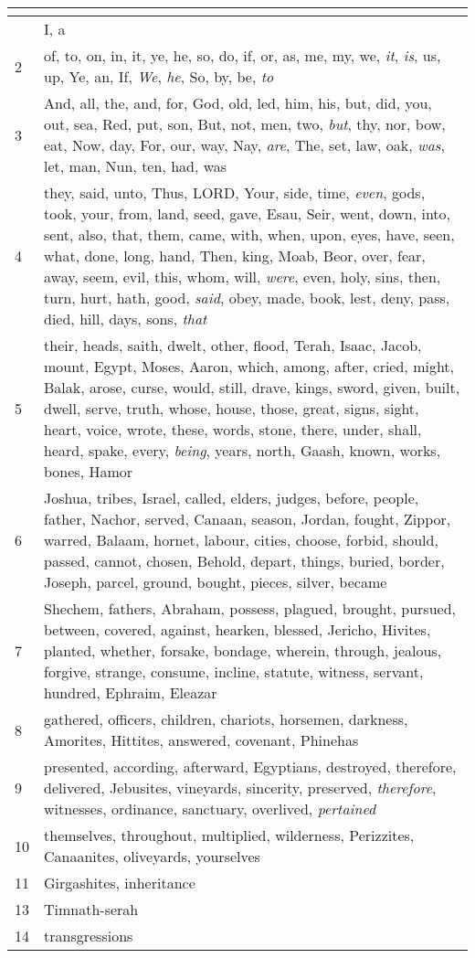 \begin{center}
\begin{longtable}{l|p{3.75in}}
\hline \multicolumn{2}{c}{{ }} \\ \hline
\endfoot 
1 & I, a\\ \hline 
2 & of, to, on, in, it, ye, he, so, do, if, or, as, me, my, we, \emph{it}, \emph{is}, us, up, Ye, an, If, \emph{We}, \emph{he}, So, by, be, \emph{to}\\ \hline 
3 & And, all, the, and, for, God, old, led, him, his, but, did, you, out, sea, Red, put, son, But, not, men, two, \emph{but}, thy, nor, bow, eat, Now, day, For, our, way, Nay, \emph{are}, The, set, law, oak, \emph{was}, let, man, Nun, ten, had, was\\ \hline 
4 & they, said, unto, Thus, LORD, Your, side, time, \emph{even}, gods, took, your, from, land, seed, gave, Esau, Seir, went, down, into, sent, also, that, them, came, with, when, upon, eyes, have, seen, what, done, long, hand, Then, king, Moab, Beor, over, fear, away, seem, evil, this, whom, will, \emph{were}, even, holy, sins, then, turn, hurt, hath, good, \emph{said}, obey, made, book, lest, deny, pass, died, hill, days, sons, \emph{that}\\ \hline 
5 & their, heads, saith, dwelt, other, flood, Terah, Isaac, Jacob, mount, Egypt, Moses, Aaron, which, among, after, cried, might, Balak, arose, curse, would, still, drave, kings, sword, given, built, dwell, serve, truth, whose, house, those, great, signs, sight, heart, voice, wrote, these, words, stone, there, under, shall, heard, spake, every, \emph{being}, years, north, Gaash, known, works, bones, Hamor\\ \hline 
6 & Joshua, tribes, Israel, called, elders, judges, before, people, father, Nachor, served, Canaan, season, Jordan, fought, Zippor, warred, Balaam, hornet, labour, cities, choose, forbid, should, passed, cannot, chosen, Behold, depart, things, buried, border, Joseph, parcel, ground, bought, pieces, silver, became\\ \hline 
7 & Shechem, fathers, Abraham, possess, plagued, brought, pursued, between, covered, against, hearken, blessed, Jericho, Hivites, planted, whether, forsake, bondage, wherein, through, jealous, forgive, strange, consume, incline, statute, witness, servant, hundred, Ephraim, Eleazar\\ \hline 
8 & gathered, officers, children, chariots, horsemen, darkness, Amorites, Hittites, answered, covenant, Phinehas\\ \hline 
9 & presented, according, afterward, Egyptians, destroyed, therefore, delivered, Jebusites, vineyards, sincerity, preserved, \emph{therefore}, witnesses, ordinance, sanctuary, overlived, \emph{pertained}\\ \hline 
10 & themselves, throughout, multiplied, wilderness, Perizzites, Canaanites, oliveyards, yourselves\\ \hline 
11 & Girgashites, inheritance\\ \hline 
13 & Timnath-serah\\ \hline 
14 & transgressions\\ \hline 
\end{longtable}
\end{center}





